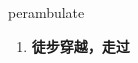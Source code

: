 
\begin{frame}
{\huge perambulate}
\begin{center}
\begin{enumerate}\Large
  \item \textbf{徒步穿越，走过}
\end{enumerate}
\end{center}
\end{frame}
